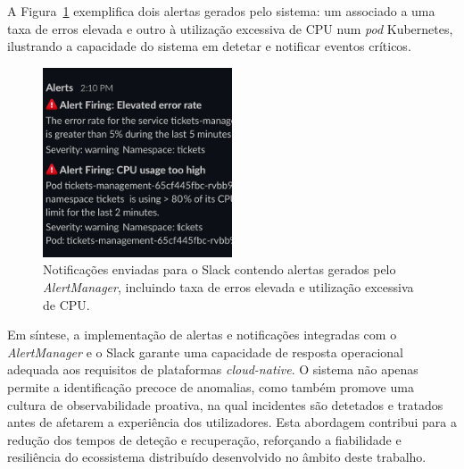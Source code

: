 A Figura~\ref{fig:slack-alerts} exemplifica dois alertas gerados pelo sistema: um associado a uma taxa de erros elevada e outro à utilização excessiva de CPU num \textit{pod} Kubernetes, ilustrando a capacidade do sistema em detetar e notificar eventos críticos.

\begin{figure}[H]
    \centering
    \includegraphics[width=0.5\textwidth]{images/Grafana/alertas.png}
    \caption{Notificações enviadas para o Slack contendo alertas gerados pelo \textit{AlertManager}, incluindo taxa de erros elevada e utilização excessiva de CPU.}
    \label{fig:slack-alerts}
\end{figure}

Em síntese, a implementação de alertas e notificações integradas com o \textit{AlertManager} e o Slack garante uma capacidade de resposta operacional adequada aos requisitos de plataformas \textit{cloud-native}. O sistema não apenas permite a identificação precoce de anomalias, como também promove uma cultura de observabilidade proativa, na qual incidentes são detetados e tratados antes de afetarem a experiência dos utilizadores. Esta abordagem contribui para a redução dos tempos de deteção e recuperação, reforçando a fiabilidade e resiliência do ecossistema distribuído desenvolvido no âmbito deste trabalho.



